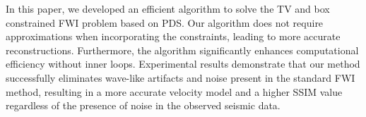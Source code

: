 In this paper, we developed an efficient algorithm to solve the TV and box constrained FWI problem based on PDS.
Our algorithm does not require approximations when incorporating the constraints, leading to more accurate reconstructions.
Furthermore, the algorithm significantly enhances computational efficiency without inner loops.
Experimental results demonstrate that our method successfully eliminates wave-like artifacts and noise present in the standard FWI method, resulting in a more accurate velocity model and a higher SSIM value regardless of the presence of noise in the observed seismic data.
